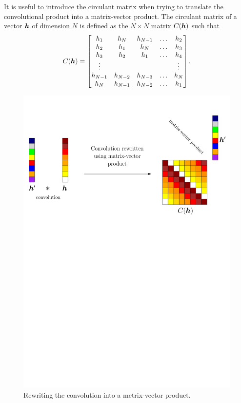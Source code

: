 It is useful to introduce the circulant matrix when trying to translate the convolutional product into a matrix-vector product. The circulant matrix of a vector $\bm{h}$ of dimension $N$ is defined as the $N \times N$ matrix $C(\bm{h})$ such that
\begin{equation*}C(\bm{h}) = 
	\begin{bmatrix}
		h_1     & h_{N}   & h_{N-1} & \dots & h_{2} \\
		h_2     & h_{1}   & h_{N}   & \dots & h_{3} \\
		h_3     & h_{2}   & h_{1}   & \dots & h_{4} \\
		\vdots  &         &         &       & \vdots \\
		h_{N-1} & h_{N-2} & h_{N-3} & \dots & h_{N} \\
		h_N     & h_{N-1} & h_{N-2} & \dots & h_{1} \\
	\end{bmatrix}
.\end{equation*}

\begin{figure}[!ht] \centering
\includegraphics[width=\textwidth]{figures/block-circulant_matrix.pdf}
\caption{Rewriting the convolution into a metrix-vector product.}\label{fig_block_circular}
\end{figure}

